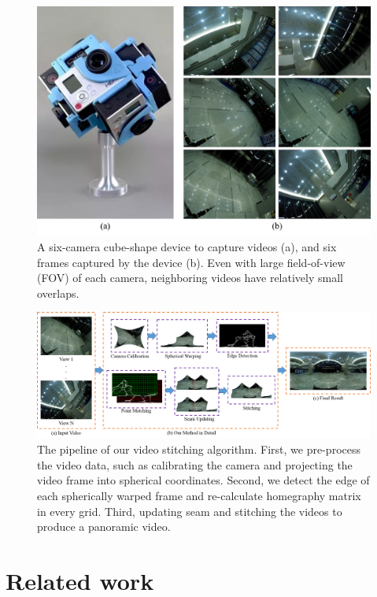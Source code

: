 \documentclass[conference]{IEEEtran}
\begin{document}
\begin{figure}[t]
\centering
\includegraphics[scale=0.36]{picture34.png}
\caption{A six-camera cube-shape device to capture videos (a), and six frames captured by the device (b). Even with large field-of-view (FOV) of each camera, neighboring videos have relatively small overlaps. }
\label{fig:equipment}
\end{figure}

\begin{figure}
\centering
\includegraphics[scale=0.54]{picture49.png}
\caption{The pipeline of our video stitching algorithm. First, we pre-process the video data, such as calibrating the camera
and projecting the video frame into spherical coordinates. Second, we detect the edge of each spherically
warped frame and re-calculate
homegraphy matrix in every grid. Third, updating seam and stitching the videos to produce a panoramic video.}
\label{fig:res}
\end{figure}

\section{Related work}
\label{sec:related}
\end{document}
